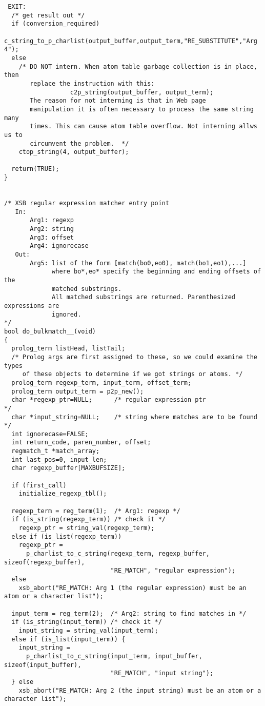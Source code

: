 \begin{verbatim}
 EXIT:
  /* get result out */
  if (conversion_required)
    c_string_to_p_charlist(output_buffer,output_term,"RE_SUBSTITUTE","Arg 4");
  else
    /* DO NOT intern. When atom table garbage collection is in place, then
       replace the instruction with this:
                  c2p_string(output_buffer, output_term);
       The reason for not interning is that in Web page
       manipulation it is often necessary to process the same string many
       times. This can cause atom table overflow. Not interning allws us to
       circumvent the problem.  */
    ctop_string(4, output_buffer);
  
  return(TRUE);
}


/* XSB regular expression matcher entry point
   In:
       Arg1: regexp
       Arg2: string
       Arg3: offset
       Arg4: ignorecase
   Out:
       Arg5: list of the form [match(bo0,eo0), match(bo1,eo1),...]
             where bo*,eo* specify the beginning and ending offsets of the
             matched substrings.
             All matched substrings are returned. Parenthesized expressions are
             ignored.
*/
bool do_bulkmatch__(void)
{
  prolog_term listHead, listTail;
  /* Prolog args are first assigned to these, so we could examine the types
     of these objects to determine if we got strings or atoms. */
  prolog_term regexp_term, input_term, offset_term;
  prolog_term output_term = p2p_new();
  char *regexp_ptr=NULL;      /* regular expression ptr               */
  char *input_string=NULL;    /* string where matches are to be found */
  int ignorecase=FALSE;
  int return_code, paren_number, offset;
  regmatch_t *match_array;
  int last_pos=0, input_len;
  char regexp_buffer[MAXBUFSIZE];

  if (first_call)
    initialize_regexp_tbl();

  regexp_term = reg_term(1);  /* Arg1: regexp */
  if (is_string(regexp_term)) /* check it */
    regexp_ptr = string_val(regexp_term);
  else if (is_list(regexp_term))
    regexp_ptr =
      p_charlist_to_c_string(regexp_term, regexp_buffer, sizeof(regexp_buffer),
                             "RE_MATCH", "regular expression");
  else
    xsb_abort("RE_MATCH: Arg 1 (the regular expression) must be an atom or a character list");

  input_term = reg_term(2);  /* Arg2: string to find matches in */
  if (is_string(input_term)) /* check it */
    input_string = string_val(input_term);
  else if (is_list(input_term)) {
    input_string =
      p_charlist_to_c_string(input_term, input_buffer, sizeof(input_buffer),
                             "RE_MATCH", "input string");
  } else
    xsb_abort("RE_MATCH: Arg 2 (the input string) must be an atom or a character list");


\end{verbatim}

